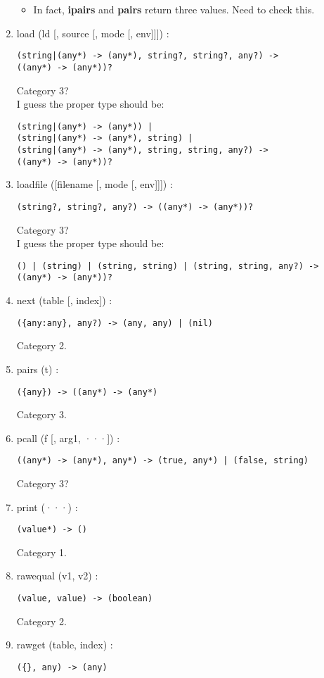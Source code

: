 \begin{enumerate}
\begin{itemize}
\item In fact, \textbf{ipairs} and \textbf{pairs} return three values.
Need to check this.
\end{itemize}
\item load (ld [, source [, mode [, env]]]) :
\begin{verbatim}
(string|(any*) -> (any*), string?, string?, any?) ->
((any*) -> (any*))?
\end{verbatim}
Category 3?
\\
I guess the proper type should be:
\begin{verbatim}
(string|(any*) -> (any*)) |
(string|(any*) -> (any*), string) |
(string|(any*) -> (any*), string, string, any?) ->
((any*) -> (any*))?
\end{verbatim}
\item loadfile ([filename [, mode [, env]]]) :
\begin{verbatim}
(string?, string?, any?) -> ((any*) -> (any*))?
\end{verbatim}
Category 3?
\\
I guess the proper type should be:
\begin{verbatim}
() | (string) | (string, string) | (string, string, any?) ->
((any*) -> (any*))?
\end{verbatim}
\item next (table [, index]) :
\begin{verbatim}
({any:any}, any?) -> (any, any) | (nil)
\end{verbatim}
Category 2.
\item pairs (t) :
\begin{verbatim}
({any}) -> ((any*) -> (any*)
\end{verbatim}
Category 3.
\item pcall (f [, arg1, ···]) :
\begin{verbatim}
((any*) -> (any*), any*) -> (true, any*) | (false, string)
\end{verbatim}
Category 3?
\item print (···) :
\begin{verbatim}
(value*) -> ()
\end{verbatim}
Category 1.
\item rawequal (v1, v2) :
\begin{verbatim}
(value, value) -> (boolean)
\end{verbatim}
Category 2.
\item rawget (table, index) :
\begin{verbatim}
({}, any) -> (any)
\end{verbatim}

\end{enumerate}
